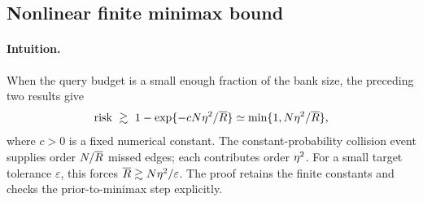 \subsection{Nonlinear finite minimax bound}
\label{app:lower-proof-nonlinear}

\paragraph{Intuition.}
When the query budget is a small enough fraction of the bank size,
the preceding two results give
\[
 \text{risk}\ \gtrsim\
 1-\exp\{-cN\EdgeCoupling^2/\RoundBudget\}
 \simeq\min\{1,N\EdgeCoupling^2/\RoundBudget\},
\]
where $c>0$ is a fixed numerical constant.
The constant-probability collision event supplies order
$N/\overline R$ missed edges; each contributes order $\eta^2$.
For a small target tolerance $\varepsilon$, this forces
$\overline R\gtrsim N\eta^2/\varepsilon$.
The proof retains the finite constants and checks the prior-to-minimax
step explicitly.

